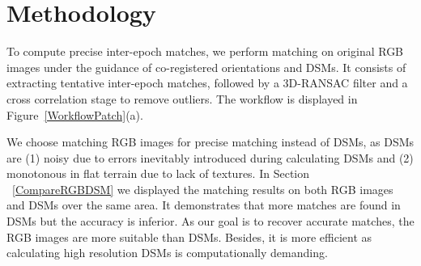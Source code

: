 \section{Methodology}
To compute precise {inter-epoch} matches, we perform matching on original RGB images {under the guidance of co-registered orientations and \ac{DSM}s}. {It consists of extracting tentative inter-epoch matches, followed by a 3D-RANSAC filter and a cross correlation stage to remove outliers.} The workflow is displayed in Figure~\ref{WorkflowPatch}(a).
\par
We choose matching RGB images for precise matching instead of \ac{DSM}s, as \ac{DSM}s are (1) noisy due to errors inevitably introduced during calculating \ac{DSM}s and (2) monotonous in flat terrain due to lack of textures. In Section ~\ref{CompareRGBDSM} we displayed the matching results on both RGB images and \ac{DSM}s over the same area. It demonstrates that more matches are found in \ac{DSM}s but the accuracy is inferior. As our goal is to recover accurate matches, the RGB images are more suitable than \ac{DSM}s. Besides, it is more efficient as calculating high resolution \ac{DSM}s is computationally demanding.\\

